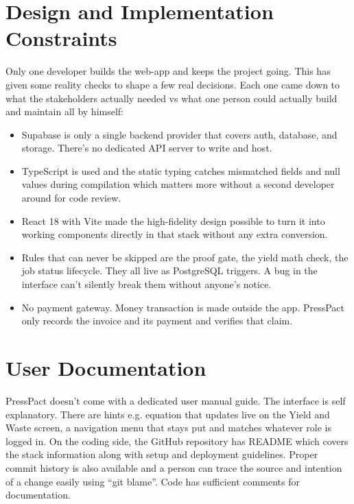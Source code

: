 \documentclass{scrreprt}
\begin{document}
\section{Design and Implementation Constraints}
Only one developer builds the web-app and keeps the project going. This has given some reality checks to shape a few real decisions. Each one came down to what the stakeholders actually needed vs what one person could actually build and maintain all by himself:
\begin{itemize}
\item Supabase is only a single backend provider that covers auth, database, and storage. There's no dedicated API server to write and host.
\item TypeScript is used and the static typing catches mismatched fields and null values during compilation which matters more without a second developer around for code review.
\item React 18 with Vite made the high-fidelity design possible to turn it into working components directly in that stack without any extra conversion.
\item Rules that can never be skipped are the proof gate, the yield math check, the job status lifecycle. They all live as PostgreSQL triggers. A bug in the interface can't silently break them without anyone's notice.
\item No payment gateway. Money transaction is made outside the app. PressPact only records the invoice and its payment and verifies that claim.
\end{itemize}

\section{User Documentation}
PressPact doesn't come with a dedicated user manual guide. The interface is self explanatory. There are hints e.g. equation that updates live on the Yield and Waste screen, a navigation menu that stays put and matches whatever role is logged in. On the coding side, the GitHub repository has README which covers the stack information along with setup and deployment guidelines. Proper commit history is also available and a person can trace the source and intention of a change easily using ``git blame''. Code has sufficient comments for documentation.
\end{document}
